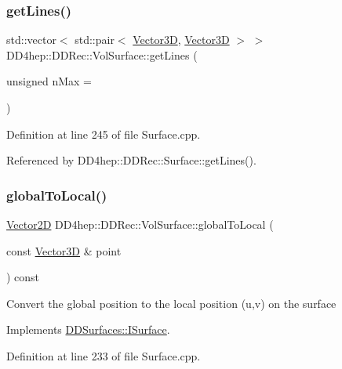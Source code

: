 \subsubsection{\texorpdfstring{get\+Lines()}{getLines()}}
{\footnotesize\ttfamily std\+::vector$<$ std\+::pair$<$ \hyperlink{class_d_d_surfaces_1_1_vector3_d}{Vector3D}, \hyperlink{class_d_d_surfaces_1_1_vector3_d}{Vector3D} $>$ $>$ D\+D4hep\+::\+D\+D\+Rec\+::\+Vol\+Surface\+::get\+Lines (\begin{DoxyParamCaption}\item[{unsigned}]{n\+Max = {} }\end{DoxyParamCaption})\hspace{0.3cm}{\ttfamily [virtual]}}



Definition at line 245 of file Surface.\+cpp.



Referenced by D\+D4hep\+::\+D\+D\+Rec\+::\+Surface\+::get\+Lines().

\hypertarget{class_d_d4hep_1_1_d_d_rec_1_1_vol_surface_aabd166d0d4ad58b57361dbfd0b81fc4d}{}\label{class_d_d4hep_1_1_d_d_rec_1_1_vol_surface_aabd166d0d4ad58b57361dbfd0b81fc4d} 
\subsubsection{\texorpdfstring{global\+To\+Local()}{globalToLocal()}}
{\footnotesize\ttfamily \hyperlink{class_d_d_surfaces_1_1_vector2_d}{Vector2D} D\+D4hep\+::\+D\+D\+Rec\+::\+Vol\+Surface\+::global\+To\+Local (\begin{DoxyParamCaption}\item[{const \hyperlink{class_d_d_surfaces_1_1_vector3_d}{Vector3D} \&}]{point }\end{DoxyParamCaption}) const\hspace{0.3cm}{\ttfamily [virtual]}}

Convert the global position to the local position (u,v) on the surface 

Implements \hyperlink{class_d_d_surfaces_1_1_i_surface_a0d6db86d4871584a9e72ac6018229737}{D\+D\+Surfaces\+::\+I\+Surface}.



Definition at line 233 of file Surface.\+cpp.



